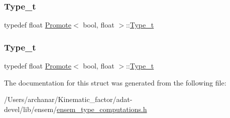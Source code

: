 \subsubsection{\texorpdfstring{Type\_t}{Type\_t}\hspace{0.1cm}{\footnotesize\ttfamily [2/3]}}
{\footnotesize\ttfamily typedef float \mbox{\hyperlink{structPromote}{Promote}}$<$ bool, float $>$\+::\mbox{\hyperlink{structPromote_3_01bool_00_01float_01_4_aa820b07e23d2dd7eee4a2344e3598502}{Type\+\_\+t}}}

\mbox{\label{structPromote_3_01bool_00_01float_01_4_aa820b07e23d2dd7eee4a2344e3598502}} 
\subsubsection{\texorpdfstring{Type\_t}{Type\_t}\hspace{0.1cm}{\footnotesize\ttfamily [3/3]}}
{\footnotesize\ttfamily typedef float \mbox{\hyperlink{structPromote}{Promote}}$<$ bool, float $>$\+::\mbox{\hyperlink{structPromote_3_01bool_00_01float_01_4_aa820b07e23d2dd7eee4a2344e3598502}{Type\+\_\+t}}}



The documentation for this struct was generated from the following file\+:\begin{DoxyCompactItemize}
\item 
/\+Users/archanar/\+Kinematic\+\_\+factor/adat-\/devel/lib/ensem/\mbox{\hyperlink{adat-devel_2lib_2ensem_2ensem__type__computations_8h}{ensem\+\_\+type\+\_\+computations.\+h}}\end{DoxyCompactItemize}
